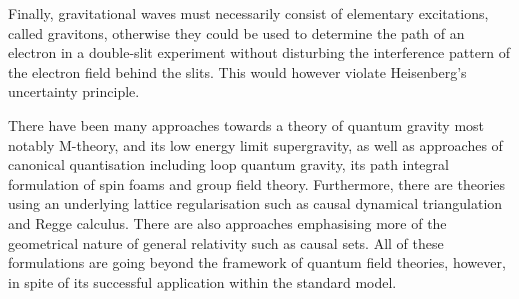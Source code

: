 \documentclass[11pt]{book}
\numberwithin{equation}{chapter}
\begin{document}
Finally, gravitational waves must necessarily consist of elementary excitations, called gravitons,
otherwise they could be used to determine the path of an electron in a double-slit experiment
without disturbing the interference pattern of the electron field behind the slits. This would
however violate Heisenberg's uncertainty principle.

There have been many approaches towards a theory of quantum gravity
most notably M-theory,
and its low energy limit supergravity,
as well as approaches of canonical quantisation including loop
quantum gravity, its path integral formulation of spin foams and
group field theory. Furthermore, there are theories using an underlying
lattice regularisation such as causal dynamical triangulation and
Regge calculus. There are also approaches emphasising more of the geometrical
nature of general relativity such as causal sets.
All of these formulations are going beyond the framework of quantum
field theories, however, in spite of its successful application within the standard model.
\end{document}
